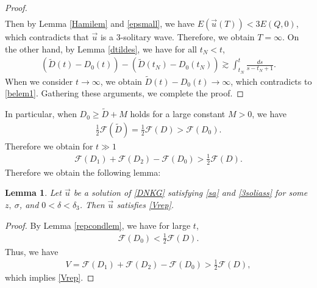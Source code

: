 \documentclass[reqno]{amsart}
\theoremstyle{plain}
\newtheorem{lemma}[theorem]{Lemma}
\theoremstyle{definition}
\numberwithin{equation}{section}
\newcommand{\1}{\mathbbm{1}}
\begin{document}
\begin{proof}
\begin{align*}
\end{align*}
Then by Lemma \ref{Hamilem} and \eqref{epsmall}, we have $E(\vec{u}(T))<3E(Q,0)$, which contradicts that $\vec{u}$ is a 3-solitary wave. Therefore, we obtain $T=\infty$. On the other hand, by Lemma \ref{dtildes}, we have for all $t_N<t$,
\begin{align*}
\left(\tilde{D}(t)-D_0(t)\right)-\left(\tilde{D}(t_N)-D_0(t_N)\right)\gtrsim \int_{t_N}^t \frac{ds}{s-t_N+1}.
\end{align*}
When we consider $t\to\infty$, we obtain $\tilde{D}(t)-D_0(t)\to \infty$, which contradicts to \eqref{belem1}. Gathering these arguments, we complete the proof.
\end{proof}



In particular, when $D_0\geq \tilde{D}+M$ holds for a large constant $M>0$, we have
\begin{align*}
\frac{1}{2}\mathcal{F}(\tilde{D})=\frac{1}{2}\mathcal{F}(D)>\mathcal{F}(D_0).
\end{align*}
Therefore we obtain for $t\gg 1$
\begin{align*}
\mathcal{F}(D_1)+\mathcal{F}(D_2)-\mathcal{F}(D_0)> \frac{1}{2}\mathcal{F}(D).
\end{align*}
Therefore we obtain the following lemma:
\begin{lemma}\label{3solirep}
Let $\vec{u}$ be a solution of \eqref{DNKG} satisfying \eqref{sa} and \eqref{3soliass} for some $z,\ \sigma$, and $0<\delta<\delta_3$. Then $\vec{u}$ satisfies \eqref{Vrep}.
\end{lemma}
\begin{proof}
By Lemma \ref{repcondlem}, we have for large $t$,
\begin{align*}
\mathcal{F}(D_0)<\frac{1}{2}\mathcal{F}(D).
\end{align*}
Thus, we have
\begin{align*}
V=\mathcal{F}(D_1)+\mathcal{F}(D_2)-\mathcal{F}(D_0)>\frac{1}{2}\mathcal{F}(D),
\end{align*}
which implies \eqref{Vrep}.
\end{proof}
\end{document}
